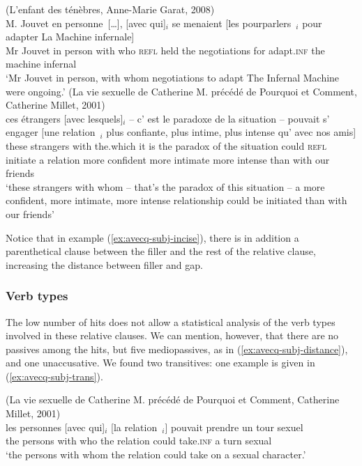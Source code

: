 \eal\label{ex:avecq-subj-distance}
\ex (L'enfant des ténèbres, Anne-Marie Garat, 2008)\\
\gll M. Jouvet en personne~[\dots], [avec qui]$_i$ se menaient [les pourparlers~\trace{}$_i$ pour adapter La Machine infernale]\\
Mr Jouvet in person with who \textsc{refl} held the negotiations for adapt\textsc{.inf} the machine infernal\\
\glt `Mr Jouvet in person, with whom negotiations to adapt The Infernal Machine were ongoing.'
\label{ex:avecq-subj-inv}
\ex (La vie sexuelle de Catherine M. précédé de Pourquoi et Comment, Catherine Millet, 2001)\\
\gll ces étrangers [avec lesquels]$_i$ -- c' est le paradoxe de la situation -- pouvait s' engager [une relation~\trace{}$_i$ plus confiante, plus intime, plus intense qu' avec nos amis]\\
these strangers with the.which {} it is the paradox of the situation {} could \textsc{refl} initiate a relation more confident more intimate more intense than with our friends\\
\glt `these strangers with whom -- that's the paradox of this situation -- a more confident, more intimate, more intense relationship could be initiated than with our friends'
\label{ex:avecq-subj-incise}
\zl 

Notice that in example (\ref{ex:avecq-subj-incise}), there is in addition a parenthetical clause between the filler and the rest of the relative clause, increasing the distance between filler and gap. 

\subsubsection{Verb types}

The low number of hits does not allow a statistical analysis of the verb types involved in these relative clauses. We can mention, however, that there are no passives among the hits, but five mediopassives, as in (\ref{ex:avecq-subj-distance}), and one unaccusative. We found two transitives: one example is given in (\ref{ex:avecq-subj-trans}). 


\ea (La vie sexuelle de Catherine M. précédé de Pourquoi et Comment, Catherine Millet, 2001)\\
\gll les personnes [avec qui]$_i$ [la relation~\trace{}$_i$] pouvait prendre un tour sexuel\\
the persons with who the relation could take\textsc{.inf} a turn sexual\\
\glt `the persons with whom the relation could take on a sexual character.'
\label{ex:avecq-subj-trans}
\z  

